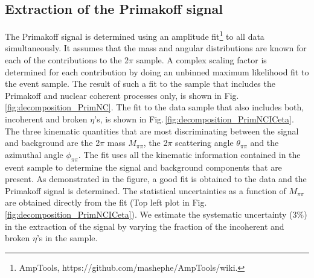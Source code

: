 \subsection{Extraction of the Primakoff signal \label{sec:signalfit}}
The Primakoff signal is determined using an amplitude fit\footnote{AmpTools, https://github.com/mashephe/AmpTools/wiki.} to all data simultaneously. It assumes that the mass and angular distributions are known for each of the contributions to the 2$\pi$ sample. A complex scaling factor is determined for each contribution by doing an unbinned maximum likelihood fit to the event sample. The result of such a fit to the sample that includes the Primakoff and nuclear coherent processes only, is shown in  Fig.\,\ref{fig:decomposition_PrimNC}. The fit to the data sample that also includes both, incoherent and broken $\eta$'s, is shown in Fig.\,\ref{fig:decomposition_PrimNCICeta}. The three kinematic quantities that are most discriminating between the signal and background are the 2$\pi$ mass $M_{\pi\pi}$, the 2$\pi$ scattering angle $\theta_{\pi\pi}$ and the azimuthal angle $\phi_{\pi\pi}$. The fit uses all the kinematic information contained in the event sample to determine the signal and background components that are present. As demonstrated in the figure, a good fit is obtained to the data and the Primakoff signal is determined. The statistical uncertainties as a function of $M_{\pi\pi}$ are obtained directly from the fit (Top left plot in Fig.\,\ref{fig:decomposition_PrimNCICeta}). We estimate the systematic uncertainty (3\%) in the extraction of the signal by varying the fraction of the incoherent  and broken $\eta$'s in the sample. 

